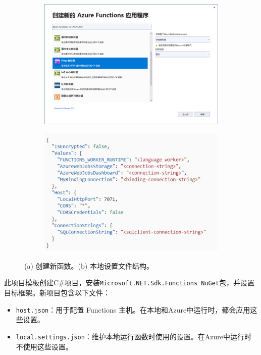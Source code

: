 \documentclass[11pt]{article}
\begin{document}
\begin{figure}[!htbp]
	\begin{subfigure}[b]{0.5\linewidth}
		\includegraphics[width=\linewidth]{figs/3.png}
		\caption{}
		\label{fig3}
	\end{subfigure}
	\begin{subfigure}[b]{0.5\linewidth}
		\includegraphics[width=\linewidth]{figs/4.png}
		\caption{}
		\label{fig4}
	\end{subfigure}
	\caption{(a) 创建新函数。(b) 本地设置文件结构。}
\end{figure}
此项目模板创建C\#项目，安装\texttt{Microsoft.NET.Sdk.Functions NuGet}包，并设置目标框架。新项目包含以下文件：
\begin{itemize}
	\item \texttt{host.json}：用于配置 Functions 主机。在本地和Azure中运行时，都会应用这些设置。 
	\item \texttt{local.settings.json}：维护本地运行函数时使用的设置。在Azure中运行时不使用这些设置。
\end{itemize}
\end{document}
